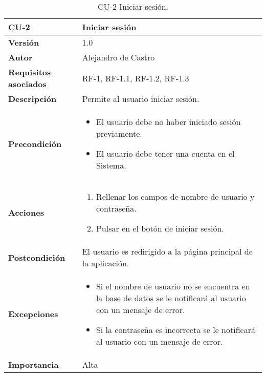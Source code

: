 \begin{table}[p]
	\centering
	\begin{tabularx}{\linewidth}{ p{} p{} }
		\toprule
		\textbf{CU-2}    & \textbf{Iniciar sesión}\\
		\toprule
		\textbf{Versión}              & 1.0    \\
		\textbf{Autor}                & {Alejandro de Castro} \\
		\textbf{Requisitos asociados} & RF-1, RF-1.1, RF-1.2, RF-1.3 \\
		\textbf{Descripción}          & Permite al usuario iniciar sesión. \\
		\textbf{Precondición}         & \begin{itemize}
		    \item El usuario debe no haber iniciado sesión previamente. 
            \item El usuario debe tener una cuenta en el Sistema.
		\end{itemize} \\
		\textbf{Acciones}             &
		\begin{enumerate}
			\def\labelenumi{\arabic{enumi}.}
			\tightlist
			\item Rellenar los  campos de nombre de usuario y contraseña.
			\item Pulsar en el botón de iniciar sesión.
		\end{enumerate}\\
		\textbf{Postcondición}        & El usuario es redirigido a la página principal de la aplicación. \\
		\textbf{Excepciones}          & \begin{itemize}
		    \item Si el nombre de usuario no se encuentra en la base de datos se le notificará al usuario con un mensaje de error. 
            \item Si la contraseña es incorrecta se le notificará al usuario con un mensaje de error. 
		\end{itemize} \\
		\textbf{Importancia}          & Alta \\
		\bottomrule
	\end{tabularx}
	\caption{CU-2 Iniciar sesión.}
\end{table}

